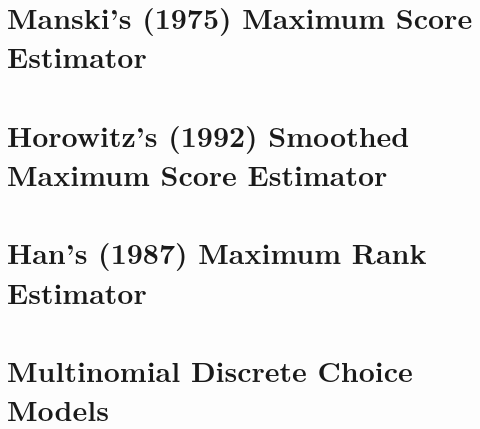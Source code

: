 \documentclass[xcolor=svgnames,dvipdfmx,cjk]{beamer}
\theoremstyle{example}
\begin{document}
\section{Manski's (1975) Maximum Score Estimator}
  
  
  
  
  
  
  
  
\section{Horowitz's (1992) Smoothed Maximum Score Estimator}
  
  
  
  
  
  
  
  
  
  
\section{Han's (1987) Maximum Rank Estimator}
  
  
  
  
  
  
  
  
  
\section{Multinomial Discrete Choice Models}
  
  
  
  
  
  
  
  
\end{document}
